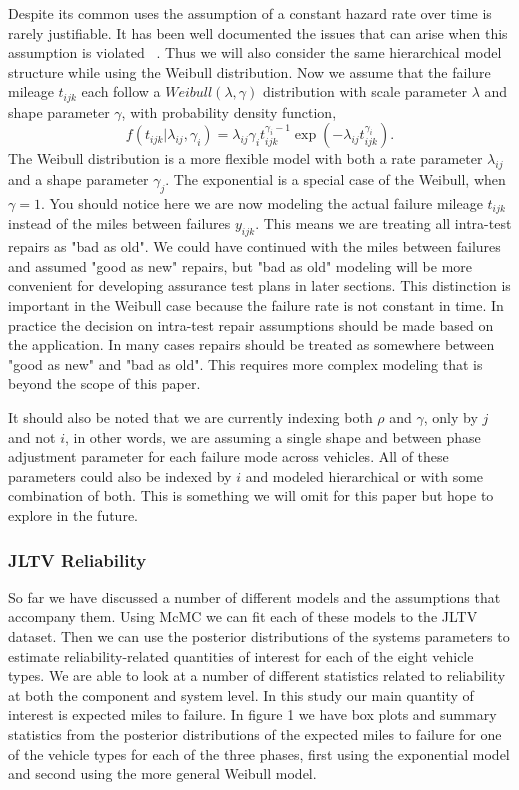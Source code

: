 \documentclass[12pt]{article}
\begin{document}
Despite its common uses the assumption of a constant hazard rate over time is
rarely justifiable.  It has been well documented the issues that can arise when
this assumption is violated ~\cite{ref3}.  Thus we will also consider the same
hierarchical model structure while using the Weibull distribution.  Now we
assume that the failure mileage $t_{ijk}$ each follow a $Weibull(\lambda, \gamma)$
distribution with scale parameter $\lambda$ and shape parameter $\gamma$, with
probability density function,
\begin{equation*}
    f(t_{ijk}|\lambda_{ij},\gamma_{i})=\lambda_{ij}\gamma_{i}
    t_{ijk}^{\gamma_{i}-1}\exp(-\lambda_{ij} t_{ijk}^{\gamma_{i}}).
\end{equation*}
The Weibull distribution is a more flexible model with both a rate parameter
$\lambda_{ij}$ and a shape parameter $\gamma_{j}$.  The exponential is a special
case of the Weibull, when $\gamma = 1$.  You should notice here we are now
modeling the actual failure mileage $t_{ijk}$ instead of the miles between
failures $y_{ijk}$.  This means we are treating all intra-test repairs as "bad
as old".  We could have continued with the miles between failures and assumed
"good as new" repairs, but "bad as old" modeling will be more convenient for
developing assurance test plans in later sections.  This distinction is
important in the Weibull case because the failure rate is not constant in time.
In practice the decision on intra-test repair assumptions should be made based
on the application.  In many cases repairs should be treated as somewhere
between "good as new" and "bad as old".  This requires more complex modeling
that is beyond the scope of this paper.

It should  also be noted that we are currently indexing both $\rho$ and
$\gamma$, only by $j$ and not $i$, in other words, we are assuming a single
shape and between phase adjustment parameter for each failure mode across
vehicles.  All of these parameters could also be indexed by $i$ and modeled
hierarchical or with some combination of both.  This is something we will omit
for this paper but hope to explore in the future.

\subsubsection{JLTV Reliability}
So far we have discussed a number of different models and the assumptions that
accompany them.  Using McMC we can fit each of these models to the JLTV dataset.
Then we can use the posterior distributions of the systems parameters to
estimate reliability-related quantities of interest for each of the eight
vehicle types.  We are able to look at a number of different statistics related
to reliability at both the component and system level.  In this study our main
quantity of interest is expected miles to  failure.  In figure 1 we have box
plots and summary statistics from the posterior distributions of the expected
miles to failure for one of the vehicle types for each of the three phases,
first using the exponential model and second using the more general Weibull
model.
\end{document}
